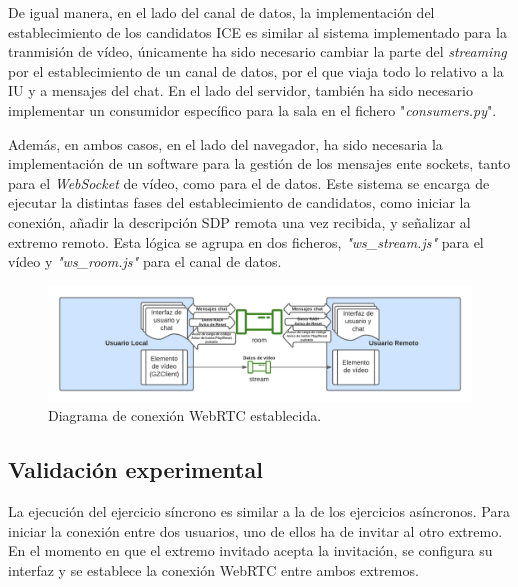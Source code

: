 \documentclass[a4paper, 12pt]{book}
\begin{document}
De igual manera, en el lado del canal de datos, la implementación del establecimiento de los candidatos ICE es similar al sistema implementado para la tranmisión de vídeo, únicamente ha sido necesario cambiar la parte del \emph{streaming} por el establecimiento de un canal de datos, por el que viaja todo lo relativo a la IU y a mensajes del chat. En el lado del servidor, también ha sido necesario implementar un consumidor específico para la sala en el fichero "\emph{consumers.py}".

Además, en ambos casos, en el lado del navegador, ha sido necesaria la implementación de un software para la gestión de los mensajes ente sockets, tanto para el \emph{WebSocket} de vídeo, como para el de datos. Este sistema se encarga de ejecutar la distintas fases del establecimiento de candidatos, como iniciar la conexión, añadir la descripción SDP remota una vez recibida, y señalizar al extremo remoto. Esta lógica se agrupa en dos ficheros, \emph{"ws\_stream.js"} para el vídeo y \emph{"ws\_room.js"} para el canal de datos.

\begin{figure}[H]
	\centering
    \includegraphics[width=15cm]{img/diagrama_conexion_webrtc.png}
    \caption{Diagrama de conexión WebRTC establecida.}
    \label{figura:diagrama_conexion_webrtc}
\end{figure}

\subsection{Validación experimental}

La ejecución del ejercicio síncrono es similar a la de los ejercicios asíncronos. Para iniciar la conexión entre dos usuarios, uno de ellos ha de invitar al otro extremo. En el momento en que el extremo invitado acepta la invitación, se configura su interfaz y se establece la conexión WebRTC entre ambos extremos.

\end{document}
